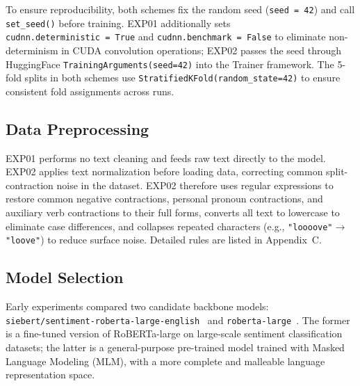 \documentclass[10pt,twocolumn]{article}
\begin{document}
To ensure reproducibility, both schemes fix the random seed
(\texttt{seed~=~42}) and call \texttt{set\_seed()} before training.
EXP01 additionally sets \texttt{cudnn.deterministic~=~True} and
\texttt{cudnn.benchmark~=~False} to eliminate non-determinism in CUDA
convolution operations; EXP02 passes the seed through HuggingFace
\texttt{TrainingArguments(seed=42)} into the Trainer framework. The
5-fold splits in both schemes use
\texttt{StratifiedKFold(random\_state=42)} to ensure consistent fold
assignments across runs.

\subsection{Data Preprocessing}

EXP01 performs no text cleaning and feeds raw text directly to the
model. EXP02 applies text normalization before loading data, correcting
common split-contraction noise in the dataset. EXP02 therefore uses
regular expressions to restore common negative contractions, personal
pronoun contractions, and auxiliary verb contractions to their full
forms, converts all text to lowercase to eliminate case differences, and
collapses repeated characters (e.g., \texttt{"loooove"}$\to$\texttt{"loove"})
to reduce surface noise. Detailed rules are listed in Appendix~C.

\subsection{Model Selection}

Early experiments compared two candidate backbone models:
\texttt{siebert/sentiment-roberta-large-english}~\cite{hartmann2023} and
\texttt{roberta-large}~\cite{liu2019roberta}. The former is a fine-tuned
version of RoBERTa-large on large-scale sentiment classification datasets;
the latter is a general-purpose pre-trained model trained with Masked
Language Modeling (MLM), with a more complete and malleable language
representation space.

\begin{table}[h]
\centering
\caption{Backbone model comparison (preliminary runs)}
\label{tab:backbone}
\end{table}
\end{document}
